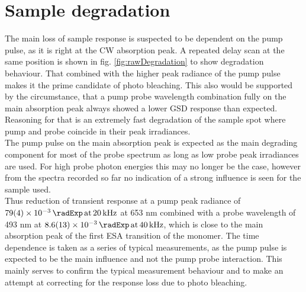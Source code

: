 \documentclass[twoside,openright]{scrreprt}
\def\pumpExp#1{\ensuremath{\SI{#1}{\radExp}\,\mathrm{at}\, \SI{20}{\kilo\hertz}}}
\def\probeExp#1{\ensuremath{\SI{#1}{\radExp}\,\mathrm{at}\, \SI{40}{\kilo\hertz}}}
\begin{document}
{\section{Sample degradation}\label{sec:degradation}
The main loss of sample response is suspected to be dependent on the pump pulse, as it is right at the CW absorption peak. A repeated delay scan at the same position is shown in fig. \ref{fig:rawDegradation} to show degradation behaviour. That combined with the higher peak radiance of the pump pulse makes it the prime candidate of photo bleaching. This also would be supported by the circumstance, that a pump probe wavelength combination fully on the main absorption peak always showed a lower GSD response than expected. Reasoning for that is an extremely fast degradation of the sample spot where pump and probe coincide in their peak irradiances.\\
The pump pulse on the main absorption peak is expected as the main degrading component for most of the probe spectrum as long as low probe peak irradiances are used. For high probe photon energies this may no longer be the case, however from the spectra recorded so far no indication of a strong influence is seen for the sample used.\\
Thus reduction of transient response at a pump peak radiance of \pumpExp{79(4)e-3} at 653 nm combined with a probe wavelength of 493 nm at \probeExp{8.6(1.3)e-3}, which is close to the main absorption peak of the first ESA transition of the monomer. The time dependence is taken as a series of typical measurements, as the pump pulse is expected to be the main influence and not the pump probe interaction. This mainly serves to confirm the typical measurement behaviour and to make an attempt at correcting for the response loss due to photo bleaching.

}
\end{document}
